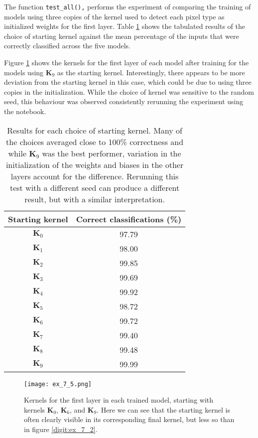 \documentclass{somasmsc}
\begin{document}
\begin{exa}
The function \verb|test_all(),| performs the experiment of comparing the training of models using three copies of the kernel used to detect each pixel type as initialized weights for the first layer. Table \ref{digit:t1} shows the tabulated results of the choice of starting kernel against the mean percentage of the inputs that were correctly classified across the five models.

Figure \ref{digit:ex_7_5} shows the kernels for the first layer of each model after training for the models using $\mathbf{K}_9$ as the starting kernel. Interestingly, there appears to be more deviation from the starting kernel in this case, which could be due to using three copies in the initialization. While the choice of kernel was sensitive to the random seed, this behaviour was observed consistently rerunning the experiment using the notebook.

\begin{table}[h!]
\centering
\begin{tabular}{ |c|c| }
 \hline
  Starting kernel & Correct classifications (\%) \\
 \hline
 $\mathbf{K}_0$ & 97.79 \\
 $\mathbf{K}_1$ & 98.00 \\
 $\mathbf{K}_2$ & 99.85 \\
 $\mathbf{K}_3$ & 99.69 \\
 $\mathbf{K}_4$ & 99.92 \\
 $\mathbf{K}_5$ & 98.72 \\
 $\mathbf{K}_6$ & 99.72 \\
 $\mathbf{K}_7$ & 99.40 \\
 $\mathbf{K}_8$ & 99.48 \\
 $\mathbf{K}_9$ & 99.99 \\
 \hline
\end{tabular}
\caption{Results for each choice of starting kernel. Many of the choices averaged close to 100\% correctness and while $\mathbf{K}_9$ was the best performer, variation in the initialization of the weights and biases in the other layers account for the difference. Rerunning this test with a different seed can produce a different result, but with a similar interpretation.}
\label{digit:t1}
\end{table}

\begin{figure}[H]\label{digit:ex_7_5}
\begin{center}
\texttt{[image: ex\_7\_5.png]}
\end{center}
\caption{Kernels for the first layer in each trained model, starting with kernels $\mathbf{K}_0$, $\mathbf{K}_6$, and $\mathbf{K}_9$. Here we can see that the starting kernel is often clearly visible in its corresponding final kernel, but less so than in figure \ref{digit:ex_7_2}.}
\end{figure}
\end{exa}
\end{document}
